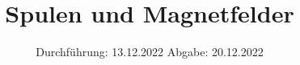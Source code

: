 



\subject{V308}
\title{Spulen und Magnetfelder}
\date{%
  Durchführung: 13.12.2022
  \hspace{3em}
  Abgabe: 20.12.2022
}


\setlength{\parindent}{0pt} %

\maketitle
\thispagestyle{empty}
\tableofcontents
\newpage







\printbibliography{}




